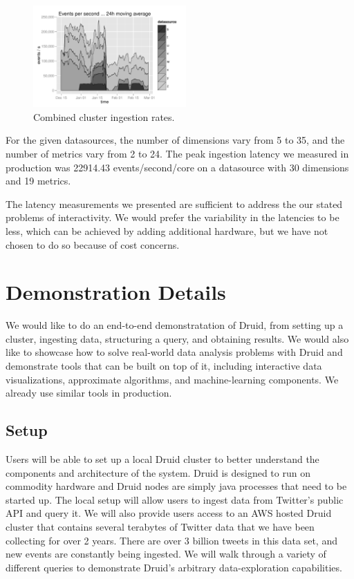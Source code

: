 \documentclass{vldb}
\begin{document}
\begin{figure}
\centering
\includegraphics[width = 2.3in]{ingestion_rate}
\caption{Combined cluster ingestion rates.}
\label{fig:ingestion_rate}
\end{figure}

For the given datasources, the number of dimensions vary from 5 to 35, and the
number of metrics vary from 2 to 24. The peak ingestion latency we measured in
production was 22914.43 events/second/core on a datasource with 30 dimensions
and 19 metrics.

The latency measurements we presented are sufficient to address the our stated
problems of interactivity. We would prefer the variability in the latencies to
be less, which can be achieved by adding additional
hardware, but we have not chosen to do so because of cost concerns.

\section{Demonstration Details}

We would like to do an end-to-end demonstratation of Druid, from setting up a
cluster, ingesting data, structuring a query, and obtaining results. We would
also like to showcase how to solve real-world data analysis problems with Druid
and demonstrate tools that can be built on top of it, including interactive
data visualizations, approximate algorithms, and machine-learning components.
We already use similar tools in production.

\subsection{Setup}

Users will be able to set up a local Druid cluster to better understand the
components and architecture of the system. Druid is designed to run on
commodity hardware and Druid nodes are simply java processes that need to be
started up. The local setup will allow users to ingest data from Twitter's
public API and query it.  We will also provide users access to an AWS hosted
Druid cluster that contains several terabytes of Twitter data that we have been
collecting for over 2 years. There are over 3 billion tweets in this data set,
and new events are constantly being ingested. We will walk through a variety of
different queries to demonstrate Druid's arbitrary data-exploration
capabilities.
\end{document}
